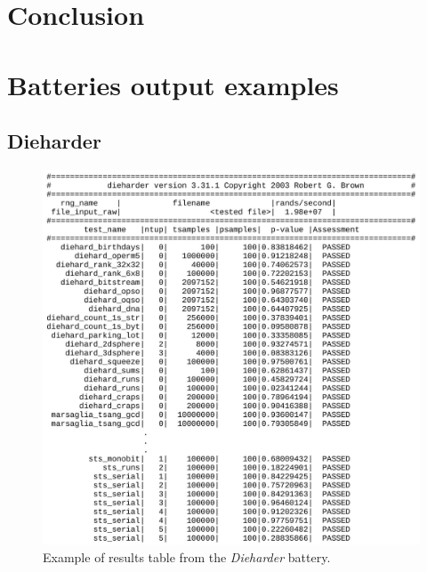 \documentclass[
  digital,     %
  oneside,     %
  nosansbold,  %
  nocolorbold, %
  nolof,         %
  nolot,         %
]{fithesis4}
\begin{document}

\chapter{Conclusion}

\appendix 

\chapter{Batteries output examples} \label{append:dieharder-output}
\section{Dieharder}

\begin{figure}[h]
  \begin{center}
    \includegraphics[width=12.5cm]{figures/outputs-appendix/dieharder.jpg}
  \end{center}
  \caption{Example of results table from the \emph{Dieharder} battery.}
  \label{fig:die_out}
\end{figure}

\pagebreak
\end{document}
